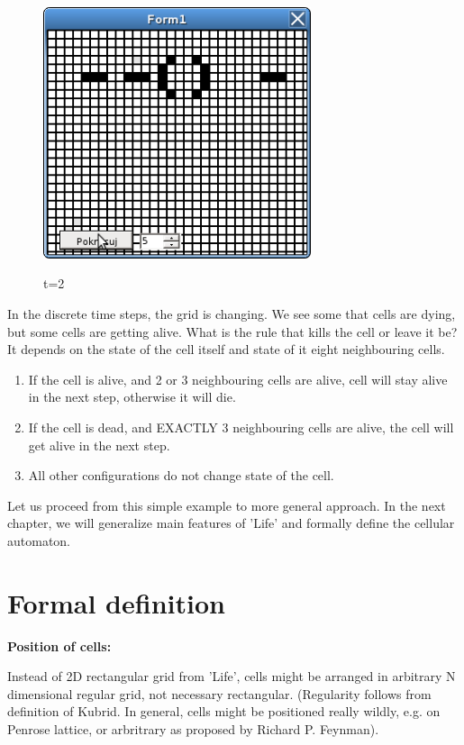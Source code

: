 \begin{figure}
 \centering
 \includegraphics[width=0.7\textwidth]{./img/gol3}
 \label{gol2}
 \caption{t=2}
\end{figure}

In the discrete time steps, the grid is changing.
We see some that cells are dying, but some cells are getting alive. 
What is the rule that kills the cell or leave it be? 
It depends on the state of the cell itself and state of it eight neighbouring cells.
\begin{enumerate}
\item If the cell is alive, and 2 or 3 neighbouring cells are alive, cell will stay alive in the next step, otherwise it will die.
\item If the cell is dead, and EXACTLY 3 neighbouring cells are alive, the cell will get alive in the next step.
\item All other configurations do not change state of the cell.

\end{enumerate}


Let us proceed from this simple example to more general approach.
In the next chapter, we will generalize main features of 'Life' and formally define the cellular automaton.

\section{Formal definition}
\textbf{Position of cells:}

Instead of 2D rectangular grid from 'Life',
cells might be arranged in arbitrary N dimensional
regular grid, not necessary rectangular. 
(Regularity follows from definition of Kubrid. In general, cells might be positioned really wildly,
e.g. on Penrose lattice, or arbritrary as proposed by Richard P. Feynman).
\bigskip

